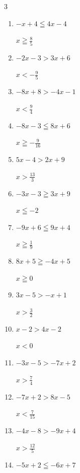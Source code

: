 \begin{multicols}{3}
\begin{enumerate}
        $\displaystyle x<\frac{5}{4}$

\columnbreak %

  \item $-x+4\leqq 4x-4$

        $\displaystyle x\geqq \frac{8}{5}$

  \item $-2x-3>3x+6$

        $\displaystyle x<-\frac{9}{5}$

  \item $-8x+8>-4x-1$

        $\displaystyle x<\frac{9}{4}$

  \item $-8x-3\leqq 8x+6$

        $\displaystyle x\geqq -\frac{9}{16}$

  \item $5x-4>2x+9$

        $\displaystyle x>\frac{13}{3}$

  \item $-3x-3\geqq 3x+9$

        $\displaystyle x\leqq -2$

  \item $-9x+6\leqq 9x+4$

        $\displaystyle x\geqq \frac{1}{9}$

  \item $8x+5\geqq -4x+5$

        $\displaystyle x\geqq 0$

  \item $3x-5>-x+1$

        $\displaystyle x>\frac{3}{2}$

  \item $x-2>4x-2$

        $\displaystyle x<0$

  \item $-3x-5>-7x+2$

        $\displaystyle x>\frac{7}{4}$

  \item $-7x+2>8x-5$

        $\displaystyle x<\frac{7}{15}$

  \item $-4x-8>-9x+4$

        $\displaystyle x>\frac{12}{5}$

  \item $-5x+2\leqq -6x+7$


\end{enumerate}
\end{multicols}

